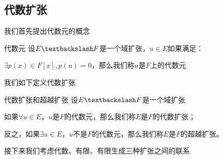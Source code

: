 \documentclass[12pt, a4paper, oneside, UTF8]{ctexbook}
\begin{document}
		\subsection{代数扩张}
			我们首先提出代数元的概念
			\begin{defn}{代数元}{}
				设$E \textbackslash F$是一个域扩张，$u \in E$如果满足：

				$\exists p(x) \in F[x],p(u)=0$，那么我们称$u$是$F$上的代数元
			\end{defn}
			我们如下定义代数扩张
			\begin{defn}{代数扩张和超越扩张}{}
				设$E \textbackslash F$是一个域扩张

				如果$\forall u \in E$，$u$是$F$的代数元，那么我们称$E$是$F$的代数扩张；

				反之，如果$\exists u \in E$，$u$不是$F$的代数元，那么我们称$E$是$F$的超越扩张。
			\end{defn}
			接下来我们考虑代数、有限、有限生成三种扩张之间的联系
\end{document}
